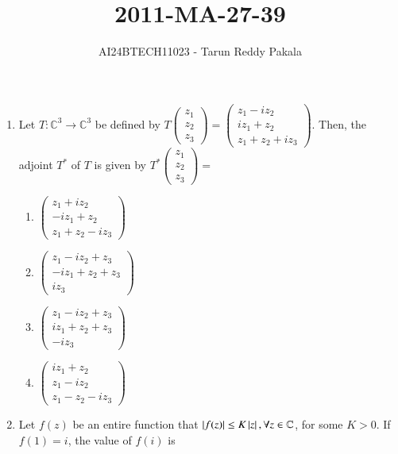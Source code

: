 \documentclass[journal,12pt,onecolumn]{IEEEtran}
\title{2011-MA-27-39}
\author{AI24BTECH11023 - Tarun Reddy Pakala}
\theoremstyle{remark}
\begin{document}


\maketitle
\bigskip
\renewcommand{\thefigure}{\theenumi}
\renewcommand{\thetable}{\theenumi}
\begin{enumerate}[start=27]
\item Let $T:\mathbb{C}^3 \to \mathbb{C}^3$ be defined by $T\begin{pmatrix}
z_1 \\
z_2 \\
z_3
\end{pmatrix}=\begin{pmatrix}
z_1-iz_2 \\
iz_1+z_2 \\
z_1+z_2+iz_3
\end{pmatrix}$. Then, the adjoint $T^*$ of $T$ is given by $T^*\begin{pmatrix}
z_1 \\
z_2 \\
z_3
\end{pmatrix}=$
\begin{enumerate}
 \item $  \begin{pmatrix}
z_1+iz_2 \\
-iz_1+z_2 \\
z_1+z_2-iz_3
\end{pmatrix}$
    \item $\begin{pmatrix}
z_1-iz_2+z_3 \\
-iz_1+z_2+z_3 \\
iz_3
\end{pmatrix}$
    \item $\begin{pmatrix}
z_1-iz_2+z_3 \\
iz_1+z_2+z_3 \\
-iz_3
\end{pmatrix}$
    \item $\begin{pmatrix}
iz_1+z_2 \\
z_1-iz_2 \\
z_1-z_2-iz_3
\end{pmatrix}$
\end{enumerate}
\item Let $f(z)$ be an entire function that $\left\vert f(z)\right\vert\leq K\left\vert z\right\vert, \forall z \in \mathbb{C}$, for some $K>0$. If $f(1)=i$, the value of $f(i)$ is

\end{enumerate}
\end{document}
